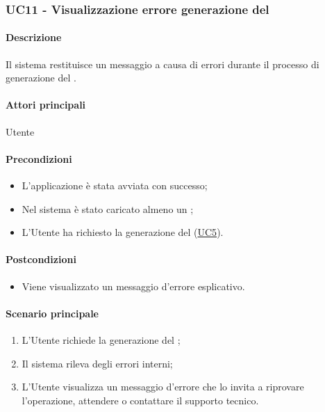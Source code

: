 \subsubsection{UC11 - Visualizzazione errore generazione del }\label{UC11}
\paragraph*{Descrizione}
Il sistema restituisce un messaggio a causa di errori durante il processo di generazione del .

\paragraph*{Attori principali}
Utente

\paragraph*{Precondizioni}
\begin{itemize}
  \item L'applicazione è stata avviata con successo;
  \item Nel sistema è stato caricato almeno un ;
  \item L'Utente ha richiesto la generazione del  (\hyperref[UC5]{UC5}).  
\end{itemize}

\paragraph*{Postcondizioni}
\begin{itemize}
  \item Viene visualizzato un messaggio d'errore esplicativo.
\end{itemize}

\paragraph*{Scenario principale}
\begin{enumerate}
  \item L'Utente richiede la generazione del ;
  \item Il sistema rileva degli errori interni;
  \item L'Utente visualizza un messaggio d'errore che lo invita a riprovare l'operazione, attendere o contattare il supporto tecnico.
\end{enumerate}
